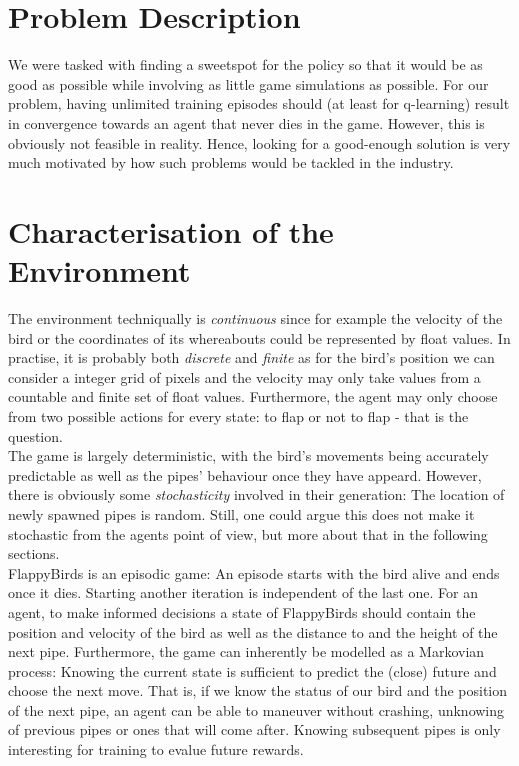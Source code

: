 \documentclass[a4paper,12pt]{article}
\begin{document}
\section{Problem Description}
We were tasked with finding a sweetspot for the policy so that it would be as good as possible while involving as 
little game simulations as
possible. For our problem, having unlimited training episodes should (at least for q-learning) result in convergence towards an agent 
that never dies in the game.
However, this is obviously not feasible in reality. Hence, looking for a good-enough solution is very much motivated by
how such problems would be tackled in the industry.

\section{Characterisation of the Environment}
The environment techniqually is \textit{continuous} since for example the velocity of the bird or the coordinates of its whereabouts
could be represented by float values. In practise, it is probably both \textit{discrete} and \textit{finite} as for the bird's position we can consider a 
integer grid of pixels and the velocity may only take values from a countable and finite set of float values. Furthermore, the agent
may only choose from two possible actions for every state: to flap or not to flap - that is the question.
\\
The game is largely deterministic, with the bird's movements being accurately predictable as well as the pipes' behaviour once they have
appeard.
However, there is obviously some \textit{stochasticity} involved in their generation: 
The location of newly spawned pipes is random. Still, one could argue
this does not make it stochastic from the agents point of view, but more about that in the following sections.
\\
FlappyBirds is an episodic game: An episode starts with the bird alive and ends once it dies. Starting another iteration is independent
of the last one.
For an agent, to make informed decisions a state of FlappyBirds should contain the position and velocity of the bird as well as the distance to
and the height of the next pipe.
Furthermore, the game can inherently be modelled as a Markovian process: Knowing the current state is sufficient to predict the (close) future
and choose the next move. That is, if we know the status of our bird and the position of the next pipe, an agent can be able
to maneuver without crashing, unknowing of previous pipes or ones that will come after. Knowing subsequent pipes is only 
interesting for training to evalue future rewards.
\end{document}
